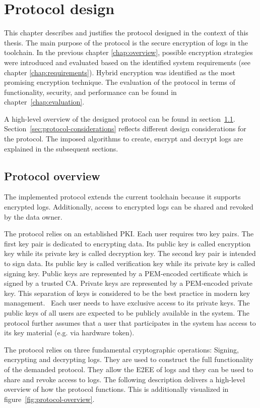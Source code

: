 \documentclass[../main.tex]{subfiles}
\begin{document}
\chapter{Protocol design}
\label{chap:design}

This chapter describes and justifies the protocol designed in the context of this thesis.
The main purpose of the protocol is the secure encryption of logs in the toolchain.
In the previous chapter \ref{chap:overview}, possible encryption strategies were introduced and evaluated based on the identified system requirements (see chapter \ref{chap:requirements}).
Hybrid encryption was identified as the most promising encryption technique.
The evaluation of the protocol in terms of functionality, security, and performance can be found in chapter~\ref{chap:evaluation}.

A high-level overview of the designed protocol can be found in section~\ref{sec:overview}.
Section~\ref{sec:protocol-considerations} reflects different design considerations for the protocol.
The imposed algorithms to create, encrypt and decrypt logs are explained in the subsequent sections. 

\section{Protocol overview}
\label{sec:overview}

The implemented protocol extends the current toolchain because it supports encrypted logs.
Additionally, access to encrypted logs can be shared and revoked by the data owner.

The protocol relies on an established PKI.
Each user requires two key pairs.
The first key pair is dedicated to encrypting data.
Its public key is called encryption key while its private key is called decryption key.
The second key pair is intended to sign data.
Its public key is called verification key while its private key is called signing key.
Public keys are represented by a PEM-encoded certificate which is signed by a trusted CA.
Private keys are represented by a PEM-encoded private key.
This separation of keys is considered to be the best practice in modern key management.~
Each user needs to have exclusive access to its private keys.
The public keys of all users are expected to be publicly available in the system.
The protocol further assumes that a user that participates in the system has access to its key material (e.g. via hardware token).

The protocol relies on three fundamental cryptographic operations:
Signing, encrypting and decrypting logs.
They are used to construct the full functionality of the demanded protocol.
They allow the E2EE of logs and they can be used to share and revoke access to logs.
The following description delivers a high-level overview of how the protocol functions.
This is additionally visualized in figure~\ref{fig:protocol-overview}.
\end{document}
